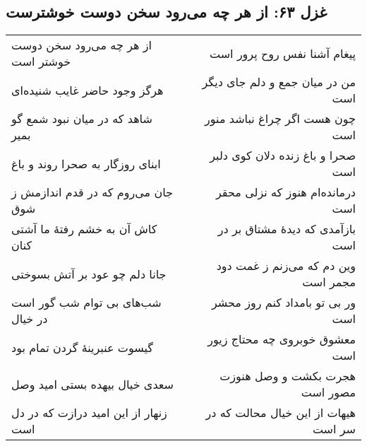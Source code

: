 \begin{center}
\section*{غزل ۶۳: از هر چه می‌رود سخن دوست خوشترست}
\label{sec:063}
\begin{longtable}{l p{0.5cm} r}
از هر چه می‌رود سخن دوست خوشتر است
&&
پیغام آشنا نفس روح پرور است
\\
هرگز وجود حاضر غایب شنیده‌ای
&&
من در میان جمع و دلم جای دیگر است
\\
شاهد که در میان نبود شمع گو بمیر
&&
چون هست اگر چراغ نباشد منور است
\\
ابنای روزگار به صحرا روند و باغ
&&
صحرا و باغ زنده دلان کوی دلبر است
\\
جان می‌روم که در قدم اندازمش ز شوق
&&
درمانده‌ام هنوز که نزلی محقر است
\\
کاش آن به خشم رفتهٔ ما آشتی کنان
&&
بازآمدی که دیدهٔ مشتاق بر در است
\\
جانا دلم چو عود بر آتش بسوختی
&&
وین دم که می‌زنم ز غمت دود مجمر است
\\
شب‌های بی توام شب گور است در خیال
&&
ور بی تو بامداد کنم روز محشر است
\\
گیسوت عنبرینهٔ گردن تمام بود
&&
معشوق خوبروی چه محتاج زیور است
\\
سعدی خیال بیهده بستی امید وصل
&&
هجرت بکشت و وصل هنوزت مصور است
\\
زنهار از این امید درازت که در دل است
&&
هیهات از این خیال محالت که در سر است
\\
\end{longtable}
\end{center}
